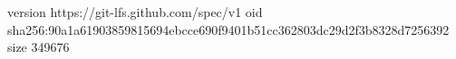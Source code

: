 version https://git-lfs.github.com/spec/v1
oid sha256:90a1a61903859815694ebcce690f9401b51cc362803dc29d2f3b8328d7256392
size 349676
